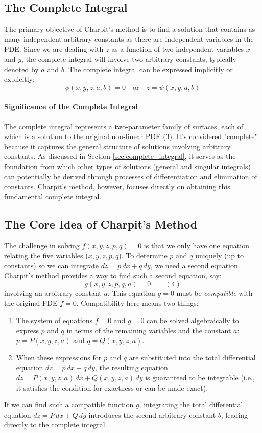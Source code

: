 \documentclass{article}
\theoremstyle{remark}
\begin{document}
	\subsection{The Complete Integral}
	\label{charpit:sec:complete_integral}
	The primary objective of Charpit's method is to find a solution that contains as many independent arbitrary constants as there are independent variables in the PDE. Since we are dealing with $z$ as a function of two independent variables $x$ and $y$, the complete integral will involve two arbitrary constants, typically denoted by $a$ and $b$. The complete integral can be expressed implicitly or explicitly:
	\[ \phi(x, y, z, a, b) = 0 \quad \text{or} \quad z = \psi(x, y, a, b) \]
	
	\paragraph{Significance of the Complete Integral}
	The complete integral represents a two-parameter family of surfaces, each of which is a solution to the original non-linear PDE (3). It's considered "complete" because it captures the general structure of solutions involving arbitrary constants. As discussed in Section \ref{sec:complete_integral}, it serves as the foundation from which other types of solutions (general and singular integrals) can potentially be derived through processes of differentiation and elimination of constants. Charpit's method, however, focuses directly on obtaining this fundamental complete integral.
	
	\subsection{The Core Idea of Charpit's Method}
	The challenge in solving $f(x, y, z, p, q) = 0$ is that we only have one equation relating the five variables ($x, y, z, p, q$). To determine $p$ and $q$ uniquely (up to constants) so we can integrate $dz = p\,dx + q\,dy$, we need a second equation.
	Charpit's method provides a way to find such a second equation, say:
	\begin{equation*}
		g(x, y, z, p, q, a) = 0 \quad \quad (4)
	\end{equation*}
	involving an arbitrary constant $a$. This equation $g=0$ must be \textit{compatible} with the original PDE $f=0$. Compatibility here means two things:
	\begin{enumerate}
		\item The system of equations $f=0$ and $g=0$ can be solved algebraically to express $p$ and $q$ in terms of the remaining variables and the constant $a$: $p = P(x, y, z, a)$ and $q = Q(x, y, z, a)$.
		\item When these expressions for $p$ and $q$ are substituted into the total differential equation $dz = p \, dx + q \, dy$, the resulting equation $dz = P(x, y, z, a) \, dx + Q(x, y, z, a) \, dy$ is guaranteed to be integrable (i.e., it satisfies the condition for exactness or can be made exact).
	\end{enumerate}
	If we can find such a compatible function $g$, integrating the total differential equation $dz = P\,dx + Q\,dy$ introduces the second arbitrary constant $b$, leading directly to the complete integral.
	
\end{document}
